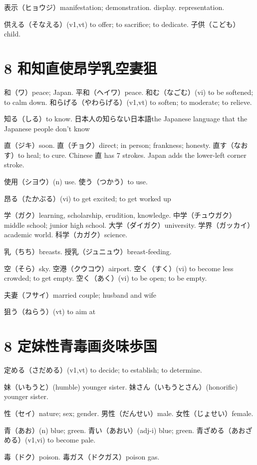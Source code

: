 表示（ヒョウジ）manifestation; demonstration. display. representation.

供える（そなえる）(v1,vt) to offer; to sacrifice; to dedicate.
子供（こども）child.

\section{8 和知直使昂学乳空妻狙}

和（ワ）peace; Japan.
平和（ヘイワ）peace.
和む（なごむ）(vi) to be softened; to calm down.
和らげる（やわらげる）(v1,vt) to soften; to moderate; to relieve.

知る（しる）to know.
日本人の知らない日本語the Japanese language that the Japanese people don't know

直（ジキ）soon.
直（チョク）direct; in person; frankness; honesty.
直す（なおす）to heal; to cure.
Chinese 直 has 7 strokes.
Japan adds the lower-left corner stroke.

使用（シヨウ）(n) use.
使う（つかう）to use.

昂る（たかぶる）(vi) to get excited; to get worked up

学（ガク）learning, scholarship, erudition, knowledge.
中学（チュウガク）middle school; junior high school.
大学（ダイガク）university.
学界（ガッカイ）academic world.
科学（カガク）science.

乳（ちち）breasts.
授乳（ジュニュウ）breast-feeding.

空（そら）sky.
空港（クウコウ）airport.
空く（すく）(vi) to become less crowded; to get empty.
空く（あく）(vi) to be open; to be empty.

夫妻（フサイ）married couple; husband and wife

狙う（ねらう）(vt) to aim at

\section{8 定妹性青毒画炎味歩国}

定める（さだめる）(v1,vt) to decide; to establish; to determine.

妹（いもうと）(humble) younger sister.
妹さん（いもうとさん）(honorific) younger sister.

性（セイ）nature; sex; gender.
男性（だんせい）male.
女性（じょせい）female.

青（あお）(n) blue; green.
青い（あおい）(adj-i) blue; green.
青ざめる（あおざめる）(v1,vi) to become pale.

毒（ドク）poison.
毒ガス（ドクガス）poison gas.

